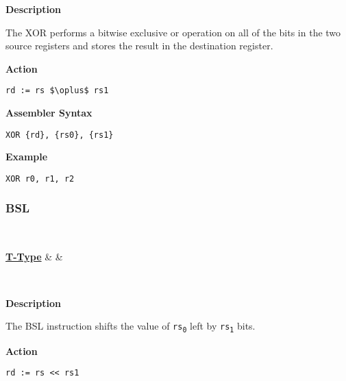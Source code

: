 \textbf{Description}

The XOR performs a bitwise exclusive or operation on all of the bits in the two source registers and stores the result in the destination register.

\vspace{3ex}

\textbf{Action}
\begin{lstlisting}[frame=single]
	rd := rs $\oplus$ rs1
\end{lstlisting}

\vspace{3ex}

\textbf{Assembler Syntax}
\begin{lstlisting}[frame=single]
	XOR {rd}, {rs0}, {rs1}
\end{lstlisting}

\vspace{3ex}

\textbf{Example}
\begin{lstlisting}[frame=single]
	XOR r0, r1, r2
\end{lstlisting}

\subsubsection{BSL }\label{sec:BSL}

\vspace{3ex}

\begin{center}
	\begin{bytefield}[leftcurly=., leftcurlyspace=0pt]{32}
		 \\
		\begin{leftwordgroup}{\hyperref[sec:t-type]{\textbf{T-Type}}}
			 & 
			 &
		\end{leftwordgroup}\\
	\end{bytefield}
\end{center}

\textbf{Description}

The BSL instruction shifts the value of \texttt{rs\textsubscript{0}} left by \texttt{rs\textsubscript{1}} bits.

\vspace{3ex}

\textbf{Action}
\begin{lstlisting}[frame=single]
	rd := rs << rs1
\end{lstlisting}

